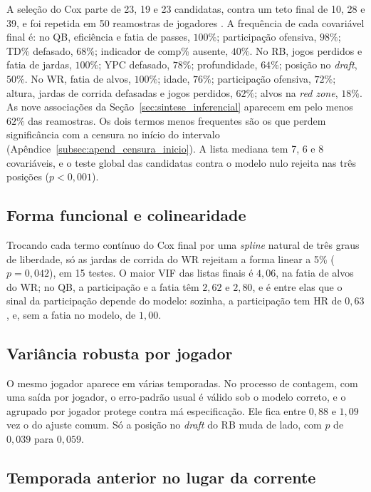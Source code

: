 A seleção do Cox parte de 23, 19 e 23 candidatas, contra um teto final de 10, 28 e 39, e foi repetida em 50 reamostras de jogadores \citep{harrell2001}. A frequência de cada covariável final é: no QB, eficiência e fatia de passes, $100\%$; participação ofensiva, $98\%$; TD\% defasado, $68\%$; indicador de comp\% ausente, $40\%$. No RB, jogos perdidos e fatia de jardas, $100\%$; YPC defasado, $78\%$; profundidade, $64\%$; posição no \textit{draft}, $50\%$. No WR, fatia de alvos, $100\%$; idade, $76\%$; participação ofensiva, $72\%$; altura, jardas de corrida defasadas e jogos perdidos, $62\%$; alvos na \textit{red zone}, $18\%$. As nove associações da Seção~\ref{sec:sintese_inferencial} aparecem em pelo menos $62\%$ das reamostras. Os dois termos menos frequentes são os que perdem significância com a censura no início do intervalo (Apêndice~\ref{subsec:apend_censura_inicio}). A lista mediana tem 7, 6 e 8 covariáveis, e o teste global das candidatas contra o modelo nulo rejeita nas três posições ($p<0{,}001$).

\subsection{Forma funcional e colinearidade}
\label{subsec:apend_forma}

Trocando cada termo contínuo do Cox final por uma \textit{spline} natural de três graus de liberdade, só as jardas de corrida do WR rejeitam a forma linear a 5\% ($p=0{,}042$), em 15 testes. O maior VIF das listas finais é $4{,}06$, na fatia de alvos do WR; no QB, a participação e a fatia têm $2{,}62$ e $2{,}80$, e é entre elas que o sinal da participação depende do modelo: sozinha, a participação tem HR de $0{,}63$, e, sem a fatia no modelo, de $1{,}00$.

\subsection{Variância robusta por jogador}
\label{subsec:apend_robvar}

O mesmo jogador aparece em várias temporadas. No processo de contagem, com uma saída por jogador, o erro-padrão usual é válido sob o modelo correto, e o agrupado por jogador protege contra má especificação. Ele fica entre $0{,}88$ e $1{,}09$ vez o do ajuste comum. Só a posição no \textit{draft} do RB muda de lado, com $p$ de $0{,}039$ para $0{,}059$.

\subsection{Temporada anterior no lugar da corrente}
\label{subsec:apend_temp_ant}

